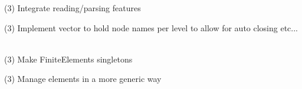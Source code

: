\begin{DoxyRefList}
(3) Integrate reading/parsing features 



(3) Implement vector to hold node names per level to allow for auto closing etc... 
\item[File \doxylink{_finite_element_8h}{Finite\+Element.h} ]\hfill \\
\label{todo__todo000025}%
%
(3) Make Finite\+Elements singletons 



(3) Manage elements in a more generic way 
\end{DoxyRefList}